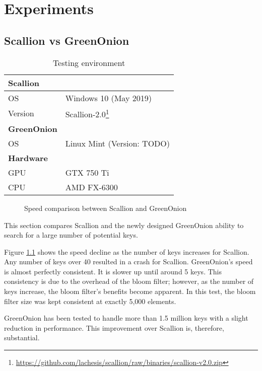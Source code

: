 \chapter{Experiments}
\label{cha:Experiments}

\section{Scallion vs GreenOnion}
\label{sec:SvG}


\begin{wraptable}[11]{r}{6cm}
    \centering
    \begin{tabular}{|ll|}
        \hline
        \textbf{Scallion} & \\
        \hline
        OS & Windows 10 (May 2019) \\
        Version & Scallion-2.0\footnote{\url{https://github.com/lachesis/scallion/raw/binaries/scallion-v2.0.zip}} \\
        \hline
        \textbf{GreenOnion} & \\
        \hline
        OS & Linux Mint (Version: TODO) \\ 
        \hline
        \textbf{Hardware} & \\
        \hline
        GPU & GTX 750 Ti  \\
        CPU & AMD FX-6300 \\
        \hline
    \end{tabular}
    \caption{Testing environment}
\end{wraptable}

\begin{figure}[h!]
    \centering
    
    \label{tab:scallion_speed}
    \caption{Speed comparison between Scallion and GreenOnion}
\end{figure}

This section compares Scallion and the newly designed GreenOnion ability to search for a large number of potential keys.

Figure \ref{tab:scallion_speed} shows the speed decline as the number of keys increases for Scallion. Any number of keys over 40 resulted in a crash for Scallion. GreenOnion's speed is almost perfectly consistent. It is slower up until  around 5 keys. This consistency is due to the overhead of the bloom filter; however, as the number of keys increase, the bloom filter's benefits become apparent. In this test, the bloom filter size was kept consistent at exactly 5,000 elements.

GreenOnion has been tested to handle more than 1.5 million keys with a slight reduction in performance. This improvement over Scallion is, therefore, substantial.

